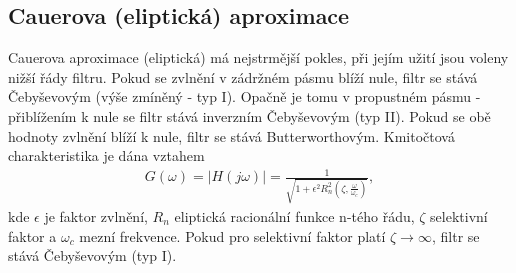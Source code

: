 \documentclass[twoside]{article}
\begin{document}
\subsection{Cauerova (eliptická) aproximace}
\noindent Cauerova aproximace (eliptická) má nejstrmější pokles, při jejím užití jsou voleny nižší řády filtru. Pokud se zvlnění v zádržném pásmu blíží nule, filtr se stává Čebyševovým (výše zmíněný - typ I). Opačně je tomu v propustném pásmu - přiblížením k nule se filtr stává inverzním Čebyševovým (typ II).  Pokud se obě hodnoty zvlnění blíží k nule, filtr se stává Butterworthovým. Kmitočtová charakteristika je dána vztahem
\begin{align}
G(\omega) = |H(j\omega)| = \frac{1}{\sqrt{1 + \epsilon ^2 R_n ^2(\zeta, \frac{\omega}{\omega _c})}},
\end{align}
kde $\epsilon$ je faktor zvlnění, $R_n$ eliptická racionální funkce n-tého řádu, $\zeta$ selektivní faktor a $\omega _c$ mezní frekvence. Pokud pro selektivní faktor platí $\zeta \rightarrow \infty$, filtr se stává Čebyševovým (typ I). 
\end{document}
